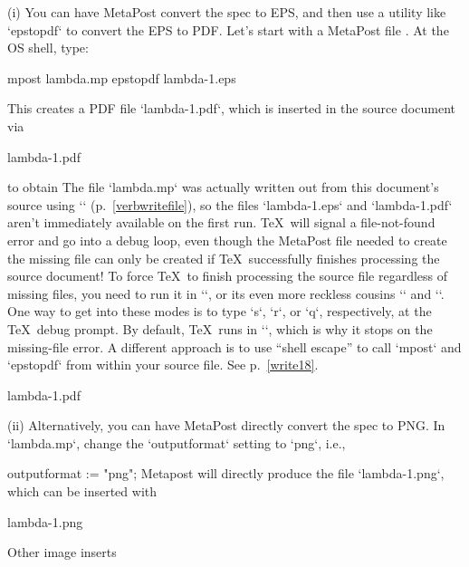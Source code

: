 \item(i) You can have MetaPost convert the spec to EPS, and
then use a utility like `epstopdf` to convert the EPS to PDF.
Let’s start with a MetaPost file
. At the OS shell, type:

\begintt
mpost lambda.mp
epstopdf lambda-1.eps
\endtt

This creates a PDF file `lambda-1.pdf`, which is inserted in
the source document via

\begintt
\centerline{\XeTeXpdffile lambda-1.pdf }
\endtt
to obtain\f{%
%
The file
`lambda.mp` was actually written out from this document’s
source using `\verbwrite` (p.~\ref{verbwritefile}),
so the files `lambda-1.eps` and `lambda-1.pdf` aren’t immediately available
on the first run. \TeX\ will signal a file-not-found error and go
into a debug loop, even though the MetaPost file needed to create
the missing file can only be created if \TeX\ successfully
finishes processing the source document! To force \TeX\ to finish
processing the source file regardless of missing files, you need
to run it in
`\scrollmode`, or its even more reckless cousins
`\nonstopmode` and `\batchmode`.  One way to get into
these modes is to type `s`, `r`, or `q`,
respectively, at the \TeX\ debug prompt.  By default, \TeX\
runs in `\errorstopmode`, which is why it stops on
the missing-file error. A different approach is to use “shell
escape” to call `mpost` and `epstopdf` from within your
source file. See p.~\ref{write18}.}


\centerline{\XeTeXpdffile lambda-1.pdf }

\item(ii) Alternatively, you can have MetaPost directly convert
the spec to
PNG. In `lambda.mp`, change the `outputformat` setting to `png`,
i.e.,

\begintt
outputformat := "png";
\endtt
Metapost will directly produce the file `lambda-1.png`, which
can be inserted with

\begintt
\XeTeXpicfile lambda-1.png
\endtt

\beginsection Other image inserts

